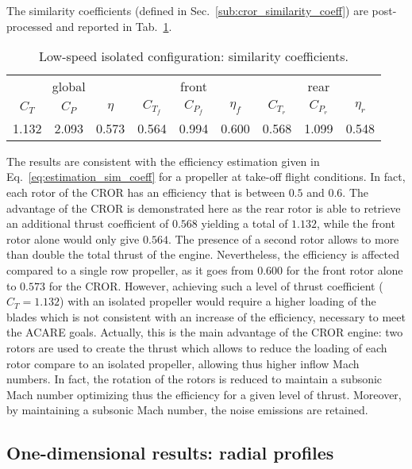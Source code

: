 The similarity coefficients (defined in 
Sec.~\ref{sub:cror_similarity_coeff}) are post-processed 
and reported in Tab.~\ref{tab:dream_ls_sim_coeff}.
\begin{table}[htp]
   \centering
  \begin{tabular}{ccc||ccc|ccc}
    \toprule
     \multicolumn{3}{c||}{global} & \multicolumn{3}{c|}{front} & \multicolumn{3}{c}{rear} \\
    $C_T$ & $C_P$ & $\eta$ & $C_{T_f}$ & $C_{P_f}$ & $\eta_f$ & $C_{T_r}$ & $C_{P_r}$ & $\eta_r$ \\
    \midrule
    1.132 & 2.093 & 0.573 & 0.564 & 0.994 &  0.600 & 0.568 & 1.099 &  0.548 \\
    \bottomrule
  \end{tabular}
  \caption{Low-speed isolated configuration: similarity coefficients.}
  \label{tab:dream_ls_sim_coeff}
\end{table}
The results are consistent with the efficiency estimation given in 
Eq.~\eqref{eq:estimation_sim_coeff} for a propeller at take-off flight conditions.
In fact, each rotor of the CROR has an efficiency that is between $0.5$
and $0.6$. The advantage of the CROR is demonstrated here as the rear
rotor is able to retrieve an additional thrust coefficient of $0.568$ yielding
a total of $1.132$, while
the front rotor alone would only give $0.564$.
The presence of a second rotor allows to more than double 
the total thrust of the engine. 
Nevertheless, the efficiency is affected compared to a single row 
propeller, as
it goes from $0.600$ for the front rotor alone to $0.573$ for the CROR.
However, achieving such a level of thrust coefficient ($C_T = 1.132$)
with an isolated
propeller would require a higher loading of the blades which is not
consistent with an increase of the efficiency, necessary to meet the ACARE goals.
Actually, this is the main advantage 
of the CROR engine: two rotors are used to create the thrust which allows to
reduce the loading of each rotor compare to an isolated propeller,
allowing thus higher inflow Mach numbers. In fact, the rotation of the rotors is reduced 
to maintain a subsonic Mach number optimizing thus the efficiency
for a given level of thrust. Moreover, by maintaining a subsonic
Mach number, the noise emissions are retained.

\subsection{One-dimensional results: radial profiles}
\label{sub:dream_ls_radial_profiles}

